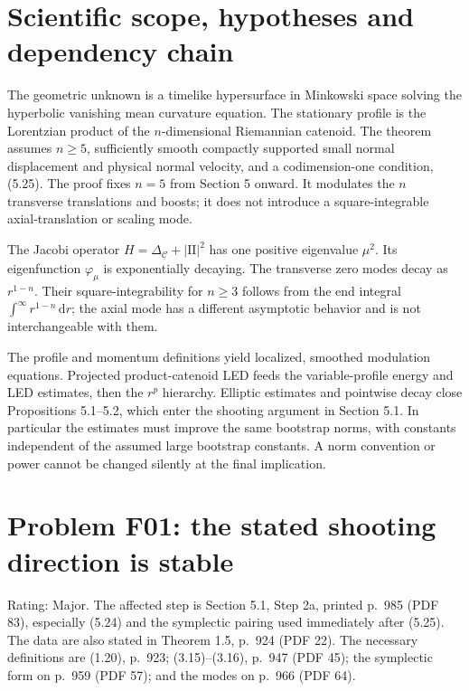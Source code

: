 \documentclass[10pt]{article}
\begin{document}
\section*{Scientific scope, hypotheses and dependency chain}
The geometric unknown is a timelike hypersurface in Minkowski space solving the hyperbolic vanishing mean curvature equation. The stationary profile is the Lorentzian product of the \(n\)-dimensional Riemannian catenoid. The theorem assumes \(n\geq5\), sufficiently smooth compactly supported small normal displacement and physical normal velocity, and a codimension-one condition, (5.25). The proof fixes \(n=5\) from Section 5 onward. It modulates the \(n\) transverse translations and boosts; it does not introduce a square-integrable axial-translation or scaling mode.\par
The Jacobi operator \(H=\Delta_{\underline{\mathcal C}}+|\mathrm{II}|^2\) has one positive eigenvalue \(\mu^2\). Its eigenfunction \(\varphi_\mu\) is exponentially decaying. The transverse zero modes decay as \(r^{1-n}\). Their square-integrability for \(n\geq3\) follows from the end integral \(\int^\infty r^{1-n}\,\mathrm dr\); the axial mode has a different asymptotic behavior and is not interchangeable with them.\par
The profile and momentum definitions yield localized, smoothed modulation equations. Projected product-catenoid LED feeds the variable-profile energy and LED estimates, then the \(r^p\) hierarchy. Elliptic estimates and pointwise decay close Propositions 5.1–5.2, which enter the shooting argument in Section 5.1. In particular the estimates must improve the same bootstrap norms, with constants independent of the assumed large bootstrap constants. A norm convention or power cannot be changed silently at the final implication.\par
\section*{Problem F01: the stated shooting direction is stable}
Rating: Major. The affected step is Section 5.1, Step 2a, printed p. 985 (PDF 83), especially (5.24) and the symplectic pairing used immediately after (5.25). The data are also stated in Theorem 1.5, p. 924 (PDF 22). The necessary definitions are (1.20), p. 923; (3.15)–(3.16), p. 947 (PDF 45); the symplectic form on p. 959 (PDF 57); and the modes on p. 966 (PDF 64).\par
\end{document}
